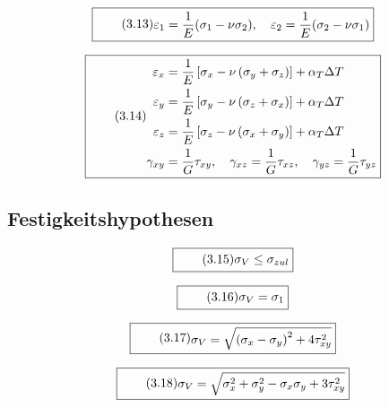 \documentclass[11pt]{article}
\newcommand{\1}{ {\mathds{1}} }
\renewcommand{\epsilon}{\varepsilon}
\begin{document}
		\begin{equation}
			\boxed{
				\tag{3.13}
				\begin{split}
					\epsilon_1 = \frac{1}{E}(\sigma_1 -\nu\sigma_2), \quad \epsilon_2 = \frac{1}{E}(\sigma_2 -\nu\sigma_1)
				\end{split}
			}
		\end{equation}

		\begin{equation}
			\boxed{
				\tag{3.14}
				\begin{split}
					\varepsilon_x &= \frac{1}{E}\left[\sigma_x -\nu   \left(\sigma_y + \sigma_z\right)\right] + \alpha_T\Delta T
					\\
					\varepsilon_y &= \frac{1}{E}\left[\sigma_y -\nu   \left(\sigma_z + \sigma_x\right)\right] + \alpha_T\Delta T\\
					\varepsilon_z &= \frac{1}{E}\left[\sigma_z -\nu   \left(\sigma_x + \sigma_y\right)\right] + \alpha_T\Delta T\\
					\gamma_{xy} &= \frac{1}{G}\tau_{xy}, \quad \gamma_{xz} = \frac{1}{G}\tau_{xz}, \quad \gamma_{yz} = \frac{1}{G}\tau_{yz}
				\end{split}
			}
		\end{equation}

		\subsection{Festigkeitshypothesen}

		\begin{equation}
			\boxed{
				\tag{3.15}
				\begin{split}
					\sigma_V \leq \sigma_{zul}
				\end{split}
			}
		\end{equation}

		\begin{equation}
			\boxed{
				\tag{3.16}
				\begin{split}
					\sigma_V= \sigma_1
				\end{split}
			}
		\end{equation}

		\begin{equation}
			\boxed{
				\tag{3.17}
				\begin{split}
					\sigma_V= \sqrt{ \left( \sigma_x - \sigma_y \right)^2 + 4\tau^2_{xy} }
				\end{split}
			}
		\end{equation}

		\begin{equation}
			\boxed{
				\tag{3.18}
				\begin{split}
					\sigma_V= \sqrt{\sigma_x^2 + \sigma_y^2 -\sigma_x\sigma_y + 3\tau^2_{xy} }
				\end{split}
			}
		\end{equation}
\end{document}
